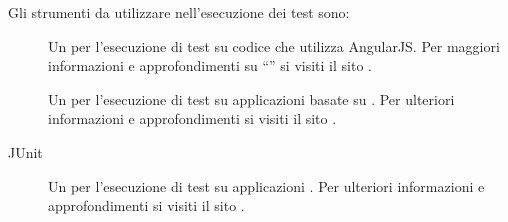 			Gli strumenti da utilizzare nell'esecuzione dei test sono:
			\begin{description}
				\item[] Un   per l'esecuzione di test su codice che utilizza AngularJS.  Per maggiori informazioni e approfondimenti su “” si visiti il sito .
				\item[] Un   per l'esecuzione di test su applicazioni basate su . Per ulteriori informazioni e approfondimenti si visiti il sito .
				\item[JUnit] Un  per l'esecuzione di test su applicazioni . Per ulteriori informazioni e approfondimenti si visiti il sito .
			\end{description}
			
